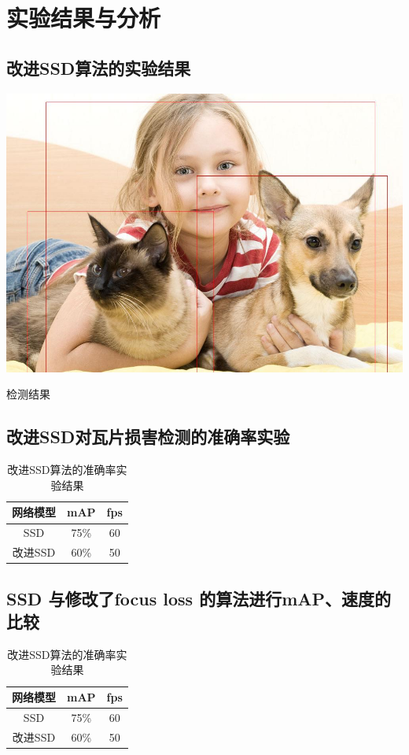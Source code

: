 \section{实验结果与分析}
\setcounter{figure}{0}

\subsection{改进SSD算法的实验结果}
\begin{uscfigure}
	\includegraphics[width=\textwidth]{./Pictures/test.jpg}	
	\caption{检测结果}
	\label{result}
\end{uscfigure}
\subsection{改进SSD对瓦片损害检测的准确率实验}
\begin{table}[htbp]
	\centering
	\caption{改进SSD算法的准确率实验结果}
	\label{}
	\begin{tabular}{ccc}
		\toprule
		网络模型 & mAP & fps\\
		\midrule
		SSD 	& 75\% & 60\\
		改进SSD  &  60\% & 50\\
		\bottomrule
	\end{tabular}
\end{table}
\subsection{SSD 与修改了focus loss 的算法进行mAP、速度的比较}
\begin{table}[htbp]
	\centering
	\caption{改进SSD算法的准确率实验结果}
	\label{}
	\begin{tabular}{ccc}
		\toprule
		网络模型 & mAP & fps\\
		\midrule
		SSD 	& 75\% & 60\\
		改进SSD  &  60\% & 50\\
		\bottomrule
	\end{tabular}
\end{table}

